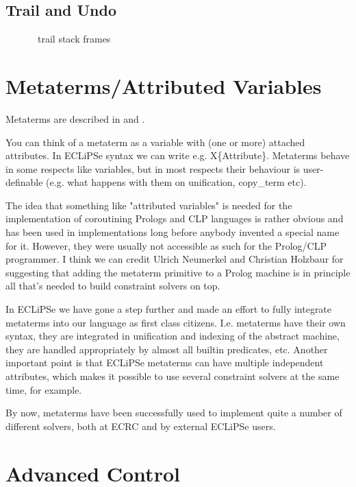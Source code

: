 \subsection{Trail and Undo}

\begin{figure}
\caption{\eclipse\ trail stack frames}
\end{figure}


\section{Metaterms/Attributed Variables}

Metaterms are described in \cite{meier92} and \cite{metaterms95}.

You can think of a metaterm as a variable with (one or more) attached
attributes.  In ECLiPSe syntax we can write e.g. X\{Attribute\}. 
Metaterms behave in some respects like variables, but in most respects
their behaviour is user-definable (e.g.  what happens with them on
unification, copy_term etc).

The idea that something like "attributed variables" is needed for the
implementation of coroutining Prologs and CLP languages is rather obvious
and has been used in implementations long before anybody invented a
special name for it. However, they were usually not accessible as such
for the Prolog/CLP programmer.
I think we can credit Ulrich Neumerkel and Christian Holzbaur for suggesting
that adding the metaterm primitive to a Prolog machine is in principle
all that's needed to build constraint solvers on top.

In ECLiPSe we have gone a step further and made an effort to fully
integrate metaterms into our language as first class citizens.
I.e. metaterms have their own syntax, they are integrated in unification
and indexing of the abstract machine, they are handled appropriately
by almost all builtin predicates, etc. Another important point is that
ECLiPSe metaterms can have multiple independent attributes, which makes it
possible to use several constraint solvers at the same time, for example.

By now, metaterms have been successfully used to implement quite a number
of  different solvers, both at ECRC and by external ECLiPSe users.


\section{Advanced Control}

